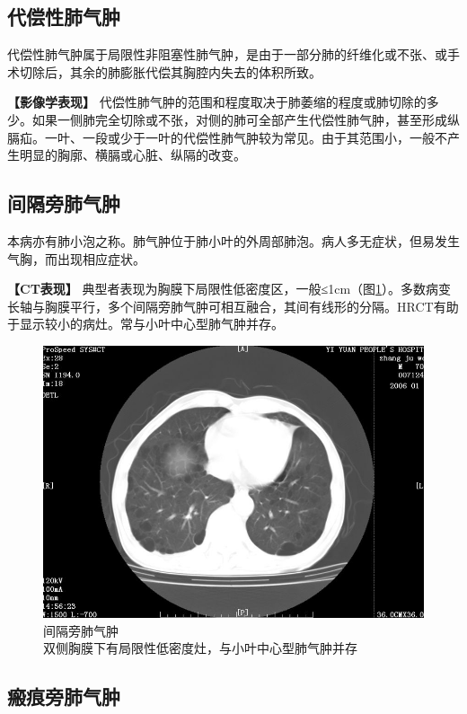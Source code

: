 \subsection{代偿性肺气肿}

代偿性肺气肿属于局限性非阻塞性肺气肿，是由于一部分肺的纤维化或不张、或手术切除后，其余的肺膨胀代偿其胸腔内失去的体积所致。

\textbf{【影像学表现】}
代偿性肺气肿的范围和程度取决于肺萎缩的程度或肺切除的多少。如果一侧肺完全切除或不张，对侧的肺可全部产生代偿性肺气肿，甚至形成纵膈疝。一叶、一段或少于一叶的代偿性肺气肿较为常见。由于其范围小，一般不产生明显的胸廓、横膈或心脏、纵隔的改变。

\subsection{间隔旁肺气肿}

本病亦有肺小泡之称。肺气肿位于肺小叶的外周部肺泡。病人多无症状，但易发生气胸，而出现相应症状。

\textbf{【CT表现】}
典型者表现为胸膜下局限性低密度区，一般≤1cm（图\ref{fig9-13}）。多数病变长轴与胸膜平行，多个间隔旁肺气肿可相互融合，其间有线形的分隔。HRCT有助于显示较小的病灶。常与小叶中心型肺气肿并存。

\begin{figure}[!htbp]
 \centering
 \includegraphics[width=.7\textwidth,height=\textheight,keepaspectratio]{./images/Image00197.jpg}
 \captionsetup{justification=centering}
 \caption{间隔旁肺气肿\\{\small 双侧胸膜下有局限性低密度灶，与小叶中心型肺气肿并存}}
 \label{fig9-13}
  \end{figure} 

\subsection{瘢痕旁肺气肿}

